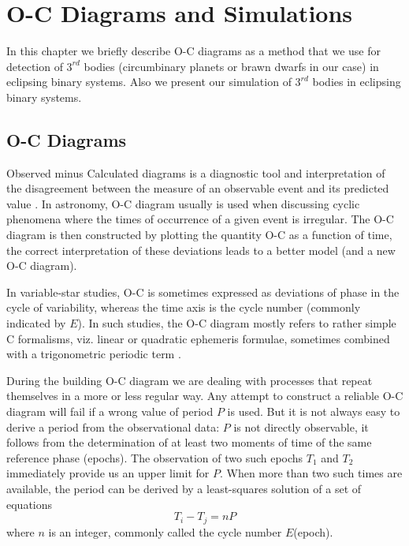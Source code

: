 \chapter{O-C Diagrams and Simulations}
\label{ch:oc_sim}

In this chapter we briefly describe O-C diagrams as a method that we use for 
detection of $3^{rd}$ bodies (circumbinary planets or brawn dwarfs in our case) in eclipsing binary systems.
Also we present our simulation of $3^{rd}$ bodies in eclipsing binary systems.

\section{O-C Diagrams}
Observed minus Calculated diagrams is a diagnostic tool and interpretation 
of the disagreement between the measure of an observable event and its predicted value \citep{Sterken2005basic}.
In astronomy, O-C diagram usually is used when discussing cyclic phenomena where the times of occurrence of a given event is irregular. 
The O-C diagram is then constructed by plotting the quantity O-C as a function of time, the correct interpretation 
of these deviations leads to a better model (and a new O-C diagram).

In variable-star studies, O-C is sometimes expressed as deviations of phase
in the cycle of variability, whereas the time axis is the cycle number (commonly indicated by $E$). 
In such studies, the O-C diagram mostly refers to rather simple C formalisms, viz. linear or quadratic ephemeris formulae, sometimes
combined with a trigonometric periodic term \citep{Sterken2005basic}.

During the building O-C diagram we are dealing with processes that repeat themselves in a more or less regular way.
Any attempt to construct a reliable O-C diagram will fail if a wrong value of period $P$ is used. 
But it is not always easy to derive a period from the observational data: 
$P$ is not directly observable, it follows from the
determination of at least two moments of time of the same reference phase (epochs). 
The observation of two such epochs $T_{1}$ and $T_{2}$ immediately provide us an upper limit for $P$. 
When more than two such times are available, the period can be derived by a least-squares solution of a set of
equations
\begin{equation} \label{eq:period}
T_{i} - T_{j} = nP
\end{equation}
where $n$ is an integer, commonly called the cycle number $E$(epoch).


